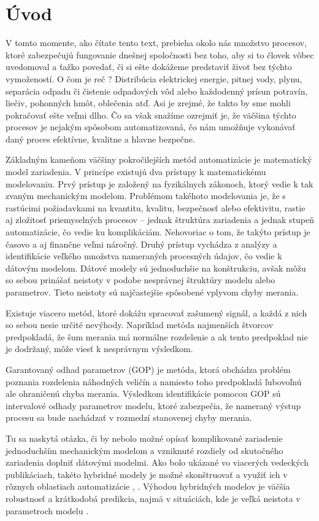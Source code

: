 \chapter*{Úvod}
V tomto momente, ako čítate tento text, prebieha okolo nás množstvo procesov, ktoré zabezpečujú fungovanie dnešnej spoločnosti bez toho, aby si to človek vôbec uvedomoval a ťažko povedať, či si ešte dokážeme predstaviť život bez týchto vymožeností. O čom je reč ? Distribúcia elektrickej energie, pitnej vody, plynu, separácia odpadu či čistenie odpadových vôd alebo každodenný prísun potravín, liečiv, pohonných hmôt, oblečenia atď. Asi je zrejmé, že takto by sme mohli pokračovať ešte veľmi dlho. Čo sa však snažíme ozrejmiť je, že väčšina týchto procesov je nejakým spôsobom automatizovaná, čo nám umožňuje vykonávať daný proces efektívne, kvalitne a hlavne bezpečne. 

Základným kameňom väčšiny pokročilejších metód automatizácie je matematický model zariadenia. V princípe existujú dva prístupy k matematickému modelovaniu. Prvý prístup je založený na fyzikálnych zákonoch, ktorý vedie k tak zvaným mechanickým modelom. Problémom takéhoto modelovania je, že s rastúcimi požiadavkami na kvantitu, kvalitu, bezpečnosť alebo efektivitu, rastie aj zložitosť priemyselných procesov -- jednak štruktúra zariadenia a jednak stupeň automatizácie, čo vedie ku komplikáciám. Nehovoriac o tom, že takýto prístup je časovo a aj finančne veľmi náročný. Druhý prístup vychádza z analýzy a identifikácie veľkého množstva nameraných procesných údajov, čo vedie k dátovým modelom. Dátové modely sú jednoduchšie na konštrukciu, avšak môžu so sebou prinášať neistoty v podobe nesprávnej štruktúry modelu alebo parametrov. Tieto neistoty sú najčastejšie spôsobené vplyvom chyby merania.

Existuje viacero metód, ktoré dokážu spracovať zašumený signál, a každá z nich so sebou nesie určité nevýhody. Napríklad metóda najmenších štvorcov predpokladá, že šum merania má normálne rozdelenie a ak tento predpoklad nie je dodržaný, môže viesť k nesprávnym výsledkom.

Garantovaný odhad parametrov (GOP) je metóda, ktorá obchádza problém poznania rozdelenia náhodných veličín a namiesto toho predpokladá ľubovoľnú ale ohraničenú chyba merania. Výsledkom identifikácie pomocou GOP sú intervalové odhady parametrov modelu, ktoré zabezpečia, že nameraný výstup procesu sa bude nachádzať v rozmedzí stanovenej chyby merania.  

Tu sa naskytá otázka, či by nebolo možné opísať komplikované zariadenie jednoduchším mechanickým modelom a vzniknuté rozdiely od skutočného zariadenia doplniť dátovými modelmi. Ako bolo ukázané vo viacerých vedeckých publikáciach, takéto hybridné modely je možné skonštruovať a využiť ich v rôznych oblastiach automatizácie \cite{hamilton:hybrid_modeling:2017}, \cite{hernandez:economics_opt_w_mismatch:2019}. Výhodou hybridných modelov je väčšia robustnosť a krátkodobá predikcia, najmä v situáciách, kde je veľká neistota v parametroch modelu \cite{hamilton:hybrid_modeling:2017}.

